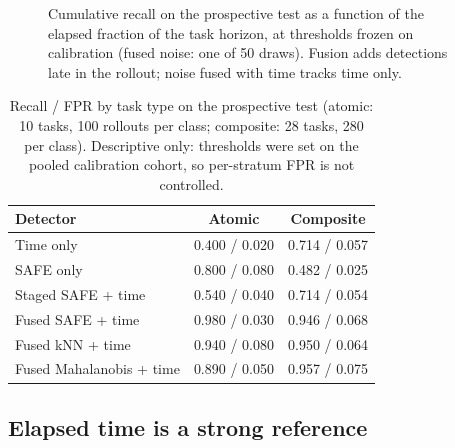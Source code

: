 \documentclass[conference,a4paper]{IEEEtran}
\begin{document}
\begin{figure}[t]
\caption{Cumulative recall on the prospective test as a function of the elapsed fraction
of the task horizon, at thresholds frozen on calibration (fused noise: one of 50 draws).
Fusion adds detections late in the rollout; noise fused with time tracks time only.}
\label{fig:horizon}
\end{figure}

\begin{table}[t]
\centering
\caption{Recall / FPR by task type on the prospective test (atomic: 10 tasks, 100 rollouts
per class; composite: 28 tasks, 280 per class). Descriptive only: thresholds were set
on the pooled calibration cohort, so per-stratum FPR is not controlled.}
\label{tab:strata}
\footnotesize
\begin{tabular}{@{}lcc@{}}
\toprule
Detector & Atomic & Composite \\
\midrule
Time only & 0.400 / 0.020 & 0.714 / 0.057 \\
SAFE only & 0.800 / 0.080 & 0.482 / 0.025 \\
Staged SAFE + time & 0.540 / 0.040 & 0.714 / 0.054 \\
Fused SAFE + time & 0.980 / 0.030 & 0.946 / 0.068 \\
Fused kNN + time & 0.940 / 0.080 & 0.950 / 0.064 \\
Fused Mahalanobis + time & 0.890 / 0.050 & 0.957 / 0.075 \\
\bottomrule
\end{tabular}
\end{table}



\subsection{Elapsed time is a strong reference}
\end{document}
